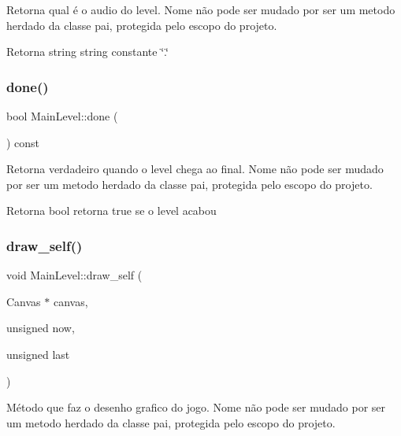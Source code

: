 Retorna qual é o audio do level. Nome não pode ser mudado por ser um metodo herdado da classe pai, protegida pelo escopo do projeto. 

\begin{DoxyReturn}{Retorna}
string string constante \char`\"{}.\char`\"{} 
\end{DoxyReturn}
\mbox{\label{classMainLevel_ae4d34d88753d7ebe90320e3cdd3e9e17}} 
\subsubsection{\texorpdfstring{done()}{done()}}
{\footnotesize\ttfamily bool Main\+Level\+::done (\begin{DoxyParamCaption}{ }\end{DoxyParamCaption}) const}



Retorna verdadeiro quando o level chega ao final. Nome não pode ser mudado por ser um metodo herdado da classe pai, protegida pelo escopo do projeto. 

\begin{DoxyReturn}{Retorna}
bool retorna \textquotesingle{}true\textquotesingle{} se o level acabou 
\end{DoxyReturn}
\mbox{\label{classMainLevel_aabad926cf0366de353d716065ab792ad}} 
\subsubsection{\texorpdfstring{draw\+\_\+self()}{draw\_self()}}
{\footnotesize\ttfamily void Main\+Level\+::draw\+\_\+self (\begin{DoxyParamCaption}\item[{Canvas $\ast$}]{canvas,  }\item[{unsigned}]{now,  }\item[{unsigned}]{last }\end{DoxyParamCaption})\hspace{0.3cm}{\ttfamily [protected]}}



Método que faz o desenho grafico do jogo. Nome não pode ser mudado por ser um metodo herdado da classe pai, protegida pelo escopo do projeto. 


